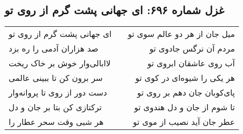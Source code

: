 \begin{center}
\section*{غزل شماره ۶۹۶: ای جهانی پشت گرم از روی تو}
\label{sec:696}
\begin{longtable}{l p{0.5cm} r}
ای جهانی پشت گرم از روی تو
&&
میل جان از هر دو عالم سوی تو
\\
صد هزاران آدمی را ره بزد
&&
مردم آن نرگس جادوی تو
\\
لاابالی‌وار خوش بر خاک ریخت
&&
آب روی عاشقان ابروی تو
\\
سر برون کن تا ببینی عالمی
&&
هر یکی را شیوه‌ای در کوی تو
\\
دست دور از روی تا پروانه‌وار
&&
پای‌کوبان جان دهم بر روی تو
\\
ترکتازی کن بتا بر جان و دل
&&
تا شوم از جان و دل هندوی تو
\\
هر شبی وقت سحر عطار را
&&
عطر جان آید نصیب از موی تو
\\
\end{longtable}
\end{center}
